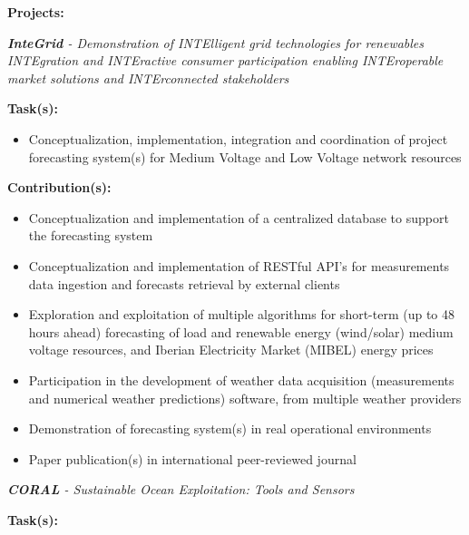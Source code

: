 \documentclass{mycv}
\begin{document}
\vspace{0.4cm}

\textbf{Projects:}

\begin{myitemize}	
	\item \textit{\textbf{InteGrid} - Demonstration of INTElligent grid technologies for renewables INTEgration and INTEractive consumer participation enabling INTEroperable market solutions and INTErconnected stakeholders}
	
		\vspace{0.4cm}
		\textbf{Task(s):}
		
		\begin{itemize}[itemsep=1px]
		\item Conceptualization, implementation, integration and coordination of project forecasting system(s) for Medium Voltage and Low Voltage network resources
		\end{itemize}
	
		\vspace{0.2cm}
		\textbf{Contribution(s):}
		
		\begin{itemize}[itemsep=1px]
		\item Conceptualization and implementation of a centralized database to support the forecasting system 
		\item Conceptualization and implementation of RESTful API's for measurements data ingestion and forecasts retrieval by external clients
		\item Exploration and exploitation of multiple algorithms for short-term (up to 48 hours ahead) forecasting of load and renewable energy (wind/solar) medium voltage resources, and Iberian Electricity Market (MIBEL) energy prices
		\item Participation in the development of weather data acquisition (measurements and numerical weather predictions) software, from multiple weather providers
		\item Demonstration of forecasting system(s) in real operational environments
		\item Paper publication(s) in international peer-reviewed journal
		\end{itemize}
	
	
	\vspace{0.6cm}	
	
	\item \textit{\textbf{CORAL} - Sustainable Ocean Exploitation: Tools and Sensors}

		\vspace{0.4cm}
		\textbf{Task(s):}


\end{myitemize}
\end{document}

